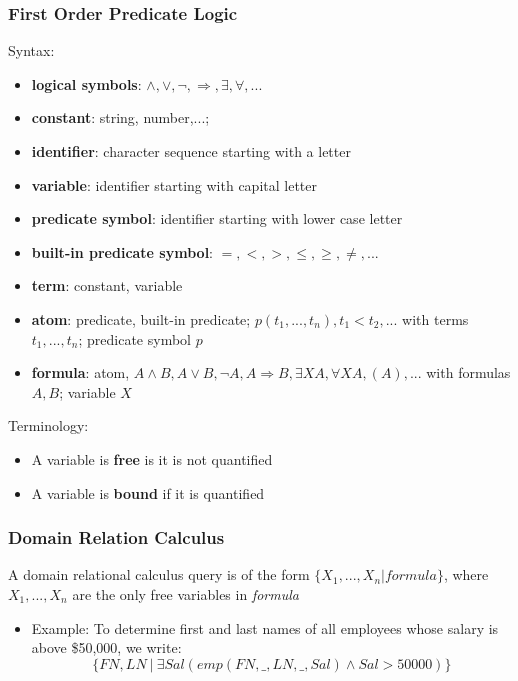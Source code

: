 \subsubsection{First Order Predicate Logic}
Syntax:
\begin{itemize}[label=\(\rhd\)]
    \item \textbf{logical symbols}: $\land, \lor, \lnot, \Rightarrow, \exists, \forall, ...$
    \item \textbf{constant}: string, number,...;
    \item \textbf{identifier}: character sequence starting with a letter
    \item \textbf{variable}: identifier starting with capital letter
    \item \textbf{predicate symbol}: identifier starting with lower case letter
    \item \textbf{built-in predicate symbol}: $=,<,>,\leq,\geq,\neq,...$
    \item \textbf{term}: constant, variable
    \item \textbf{atom}: predicate, built-in predicate; $p(t_1,...,t_n), t_1<t_2,...$ with terms $t_1,...,t_n$; predicate symbol $p$
    \item \textbf{formula}: atom, $A \land B, A \lor B, \lnot A, A \Rightarrow B, \exists XA, \forall XA, (A),... $ with formulas $A, B$; variable $X$
\end{itemize}
Terminology:
\begin{itemize}[label=\(\rhd\)]
    \item A variable is \textbf{free} is it is not quantified
    \item A variable is \textbf{bound} if it is quantified
\end{itemize}

\subsubsection{Domain Relation Calculus}
A domain relational calculus query is of the form $\{X_1,...,X_n | formula \}$, where $X_1,...,X_n$ are the only free variables in \textit{formula}
\begin{itemize}[label=\(\rhd\)]
    \item Example: To determine first and last names of all employees whose salary is above \$50,000, we write: \[
    \{FN, LN \ |\  \exists Sal(emp(FN, \_, LN, \_, Sal) \land Sal >50000) \}
    \]
\end{itemize}